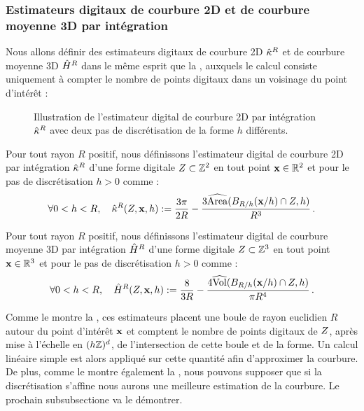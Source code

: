 \subsubsection{Estimateurs digitaux de courbure 2D et de courbure moyenne 3D par intégration}
%
Nous allons définir des estimateurs digitaux de courbure 2D $\CurvH{R}$ et de
courbure moyenne 3D $\hat{H}^{R}$ dans le même esprit que la
, auxquels le calcul consiste uniquement à
compter le nombre de points digitaux dans un voisinage du point d'intérêt :
%
\begin{figure}[ht]
  \begin{center}
    
  \end{center}
  \caption[Illustration de l'estimateur digital de courbure 2D par intégration
  $\CurvH{R}$.]{Illustration de l'estimateur digital de courbure 2D par
  intégration $\CurvH{R}$ avec deux pas de discrétisation de la forme $h$
  différents.\label{fig:2d-curv-estimator}}
\end{figure}
%
\begin{definition}\label{def:digital-2d-curvature}
  Pour tout rayon $R$ positif, nous définissons l'estimateur digital de courbure
  2D par intégration $\CurvH{R}$ d'une forme digitale $Z \subset \mathbb{Z}^2$
  en tout point $\mathbf{x} \in \mathbb{R}^2$ et pour le pas de discrétisation $h > 0$ comme :
  \begin{equation}
    \forall 0 < h < R,\quad \hat{\kappa}^{R}(Z,\mathbf{x},h) := \frac{3\pi}{2R} - \frac{3\widehat{\mathrm{Area}}(B_{R/h}(\mathbf{x}/h) \cap Z, h)}{R^3}\,.
  \end{equation}
\end{definition}
%
\begin{definition}\label{def:digital-3d-mean-curvature}
  Pour tout rayon $R$ positif, nous définissons l'estimateur digital de courbure
  moyenne 3D par intégration $\hat{H}^{R}$ d'une forme digitale $Z
  \subset \mathbb{Z}^3$ en tout point $\mathbf{x} \in \mathbb{R}^3$ et pour le pas de discrétisation $h >
  0$ comme :
  \begin{equation}
    \forall 0 < h < R,\quad \hat{H}^{R}(Z,\mathbf{x},h) := \frac{8}{3R} - \frac{4\widehat{\mathrm{Vol}}(B_{R/h}(\mathbf{x}/h) \cap Z, h)}{\pi R^4}\,.
  \end{equation}
\end{definition}
%
Comme le montre la , ces estimateurs placent
une boule de rayon euclidien $R$ autour du point d'intérêt $\mathbf{x}$ et comptent le
nombre de points digitaux de $Z$, après mise à l'échelle en $(h\mathbb{Z})^d$,
de l'intersection de cette boule et de la forme. Un calcul linéaire simple est
alors appliqué sur cette quantité afin d'approximer la courbure. De plus, comme
le montre également la , nous pouvons supposer
que si la discrétisation s'affine nous aurons une meilleure estimation de la
courbure. Le prochain subsubsectione va le démontrer.
%
